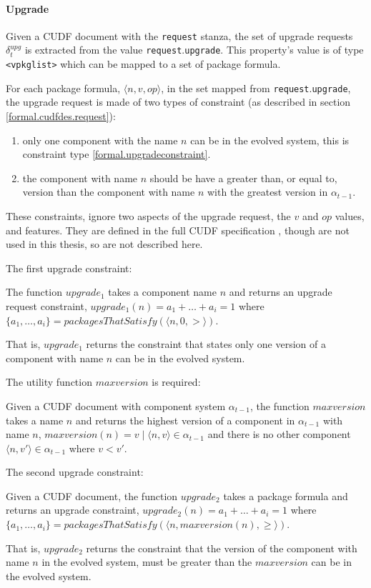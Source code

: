 \paragraph{Upgrade}
Given a CUDF document with the \texttt{request} stanza, the set of upgrade requests $\delta_t^{upg}$ is extracted from the value \texttt{request}.\texttt{upgrade}.
This property's value is of type \texttt{<vpkglist>} which can be mapped to a set of package formula.

For each package formula, $\langle n, v, op \rangle$, in the set mapped from \texttt{request}.\texttt{upgrade}, the upgrade request is made of two types of constraint 
(as described in section \ref{formal.cudfdes.request}):
\begin{enumerate}
  \item only one component with the name $n$ can be in the evolved system, this is constraint type \ref{formal.upgradeconstraint}.
  \item the component with name $n$ should be have a greater than, or equal to, version than the component with name $n$ with the greatest version in $\alpha_{t-1}$.
\end{enumerate}
These constraints, ignore two aspects of the upgrade request, the $v$ and $op$ values, and features.
They are defined in the full CUDF specification \citep{treinen2009common}, though are not used in this thesis, so are not described here.

The first upgrade constraint:
\begin{defs}
The function  $upgrade_1$ takes a component name $n$ and returns an upgrade request constraint, 
$upgrade_1(n) = a_1 + \ldots + a_i = 1$ where $\{a_1,\ldots,a_i\} = packagesThatSatisfy(\langle n,0,>\rangle)$. 
\end{defs}
That is, $upgrade_1$ returns the constraint that states only one version of a component with name $n$ can be in the evolved system.

The utility function $maxversion$ is required:
\begin{defs}
Given a CUDF document with component system $\alpha_{t-1}$, the function $maxversion$ takes a name $n$ and returns the highest version of a component in $\alpha_{t-1}$ with name $n$,
$maxversion(n) = v  \mid \langle n,v \rangle \in \alpha_{t-1}$ and there is no other component $\langle n,v' \rangle \in \alpha_{t-1}$ where $v < v'$.
\end{defs}

The second upgrade constraint:
\begin{defs}
Given a CUDF document, the function $upgrade_2$ takes a package formula and returns an upgrade constraint,
$upgrade_2(n) = a_1 + \ldots + a_i = 1$ where $\{a_1,\ldots,a_i\} = packagesThatSatisfy(\langle n,maxversion(n),\geq\rangle)$. 
\end{defs}
That is, $upgrade_2$ returns the constraint that the version of the component with name $n$ in the evolved system, must be greater than the $maxversion$ can be in the evolved system.

